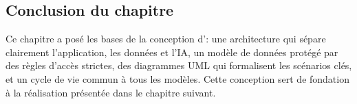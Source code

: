 \subsection{Conclusion du chapitre}

Ce chapitre a posé les bases de la conception d'\equipay : une architecture qui sépare
clairement l'application, les données et l'IA, un modèle de données protégé par des règles
d'accès strictes, des diagrammes UML qui formalisent les scénarios clés, et un cycle de vie
commun à tous les modèles. Cette conception sert de fondation à la réalisation présentée
dans le chapitre suivant.
